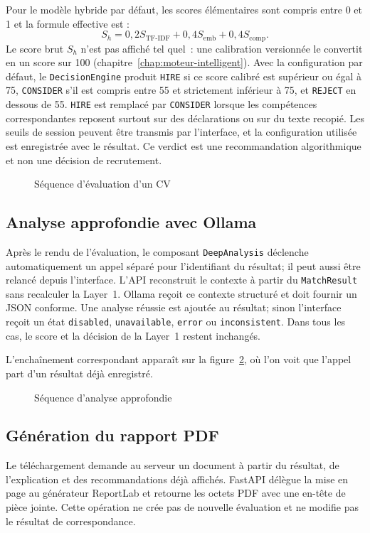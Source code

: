 Pour le modèle hybride par défaut, les scores élémentaires sont compris entre 0 et 1 et la formule effective est :
\[
S_h = 0{,}2S_{\mathrm{TF\text{-}IDF}} + 0{,}4S_{\mathrm{emb}} + 0{,}4S_{\mathrm{comp}}.
\]
Le score brut $S_h$ n'est pas affiché tel quel~: une calibration versionnée le convertit en un score sur 100 (chapitre~\ref{chap:moteur-intelligent}). Avec la configuration par défaut, le \texttt{DecisionEngine} produit \texttt{HIRE} si ce score calibré est supérieur ou égal à 75, \texttt{CONSIDER} s'il est compris entre 55 et strictement inférieur à 75, et \texttt{REJECT} en dessous de 55. \texttt{HIRE} est remplacé par \texttt{CONSIDER} lorsque les compétences correspondantes reposent surtout sur des déclarations ou sur du texte recopié. Les seuils de session peuvent être transmis par l'interface, et la configuration utilisée est enregistrée avec le résultat. Ce verdict est une recommandation algorithmique et non une décision de recrutement.

\begin{figure}[H]
\centering

\caption{Séquence d'évaluation d'un CV}
\label{fig:seq-evaluation}
\end{figure}

\subsection{Analyse approfondie avec Ollama}
Après le rendu de l'évaluation, le composant \texttt{DeepAnalysis} déclenche automatiquement un appel séparé pour l'identifiant du résultat; il peut aussi être relancé depuis l'interface. L'API reconstruit le contexte à partir du \texttt{MatchResult} sans recalculer la Layer~1. Ollama reçoit ce contexte structuré et doit fournir un JSON conforme. Une analyse réussie est ajoutée au résultat; sinon l'interface reçoit un état \texttt{disabled}, \texttt{unavailable}, \texttt{error} ou \texttt{inconsistent}. Dans tous les cas, le score et la décision de la Layer~1 restent inchangés.

L'enchaînement correspondant apparaît sur la figure~\ref{fig:seq-ollama}, où l'on voit que l'appel part d'un résultat déjà enregistré.

\begin{figure}[H]
\centering

\caption{Séquence d'analyse approfondie}
\label{fig:seq-ollama}
\end{figure}

\subsection{Génération du rapport PDF}
Le téléchargement demande au serveur un document à partir du résultat, de l'explication et des recommandations déjà affichés. FastAPI délègue la mise en page au générateur ReportLab et retourne les octets PDF avec une en-tête de pièce jointe. Cette opération ne crée pas de nouvelle évaluation et ne modifie pas le résultat de correspondance.

